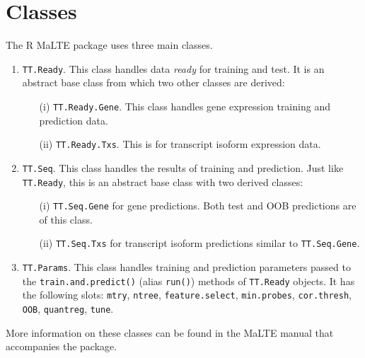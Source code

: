 \documentclass[a4paper,12pt]{article}
\begin{document}
\section{Classes}
\label{classes}
The \textsf{R} \textsf{MaLTE} package uses three main classes.
\begin{enumerate}
\item \texttt{TT.Ready}. This class handles data \textit{ready} for training and test. It is an abstract base class from which two other classes are derived:
\begin{enumerate}
\item[(i)] \texttt{TT.Ready.Gene}. This class handles gene expression training and prediction data.
\item[(ii)] \texttt{TT.Ready.Txs}. This is for transcript isoform expression data.
\end{enumerate}

\item \texttt{TT.Seq}. This class handles the results of training and prediction. Just like \texttt{TT.Ready}, this is an abstract base class with two derived classes:
\begin{enumerate}
\item[(i)] \texttt{TT.Seq.Gene} for gene predictions. Both test and OOB predictions are of this class.
\item[(ii)] \texttt{TT.Seq.Txs} for transcript isoform predictions similar to \texttt{TT.Seq.Gene}.
\end{enumerate}

\item \texttt{TT.Params}. This class handles training and prediction parameters passed to the \texttt{train.and.predict()} (alias \texttt{run()}) methods of \texttt{TT.Ready} objects. It has the following slots: \texttt{mtry}, \texttt{ntree}, \texttt{feature.select}, \texttt{min.probes}, \texttt{cor.thresh}, \texttt{OOB}, \texttt{quantreg}, \texttt{tune}.
\end{enumerate}

More information on these classes can be found in the \textsf{MaLTE} manual that accompanies the package.
\end{document}
